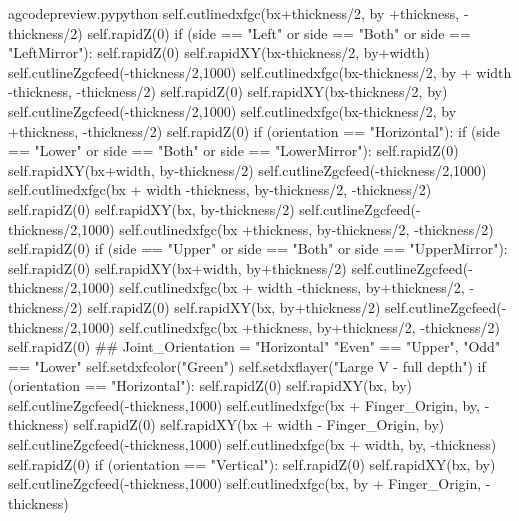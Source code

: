 \documentclass{ltxdoc}
\begin{document}
\begin{writecode}{a}{gcodepreview.py}{python}
                self.cutlinedxfgc(bx+thickness/2, by +thickness, -thickness/2)
                self.rapidZ(0)
            if (side == "Left" or side == "Both" or side == "LeftMirror"):
                self.rapidZ(0)
                self.rapidXY(bx-thickness/2, by+width)
                self.cutlineZgcfeed(-thickness/2,1000)
                self.cutlinedxfgc(bx-thickness/2, by + width -thickness, -thickness/2)
                self.rapidZ(0)
                self.rapidXY(bx-thickness/2, by)
                self.cutlineZgcfeed(-thickness/2,1000)
                self.cutlinedxfgc(bx-thickness/2, by +thickness, -thickness/2)
                self.rapidZ(0)
        if (orientation == "Horizontal"):
            if (side == "Lower" or side == "Both" or side == "LowerMirror"):
                self.rapidZ(0)
                self.rapidXY(bx+width, by-thickness/2)
                self.cutlineZgcfeed(-thickness/2,1000)
                self.cutlinedxfgc(bx + width -thickness, by-thickness/2, -thickness/2)
                self.rapidZ(0)
                self.rapidXY(bx, by-thickness/2)
                self.cutlineZgcfeed(-thickness/2,1000)
                self.cutlinedxfgc(bx +thickness, by-thickness/2, -thickness/2)
                self.rapidZ(0)
            if (side == "Upper" or side == "Both" or side == "UpperMirror"):
                self.rapidZ(0)
                self.rapidXY(bx+width, by+thickness/2)
                self.cutlineZgcfeed(-thickness/2,1000)
                self.cutlinedxfgc(bx + width -thickness, by+thickness/2, -thickness/2)
                self.rapidZ(0)
                self.rapidXY(bx, by+thickness/2)
                self.cutlineZgcfeed(-thickness/2,1000)
                self.cutlinedxfgc(bx +thickness, by+thickness/2, -thickness/2)
                self.rapidZ(0)
    ## Joint_Orientation = "Horizontal" "Even" == "Upper", "Odd" == "Lower"
        self.setdxfcolor("Green")
        self.setdxflayer("Large V - full depth")
        if (orientation == "Horizontal"):
            self.rapidZ(0)
            self.rapidXY(bx, by)
            self.cutlineZgcfeed(-thickness,1000)
            self.cutlinedxfgc(bx + Finger_Origin, by, -thickness)
            self.rapidZ(0)
            self.rapidXY(bx + width - Finger_Origin, by)
            self.cutlineZgcfeed(-thickness,1000)
            self.cutlinedxfgc(bx + width, by, -thickness)
            self.rapidZ(0)
        if (orientation == "Vertical"):
            self.rapidZ(0)
            self.rapidXY(bx, by)
            self.cutlineZgcfeed(-thickness,1000)
            self.cutlinedxfgc(bx, by + Finger_Origin, -thickness)

\end{writecode}
\end{document}
